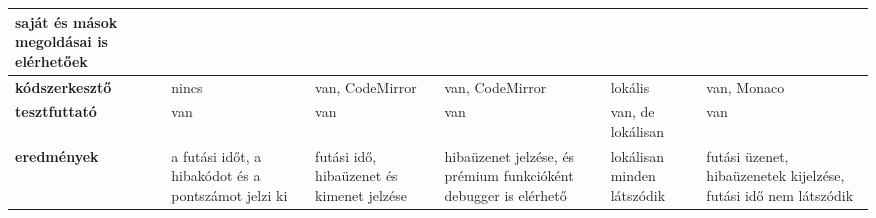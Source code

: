 {\begin{tabularx}{\textwidth}{@{}X|X|X|X|X|X@{}}
        saját és mások megoldásai is elérhetőek                                                                       \\ \hline
        \textbf{kódszerkesztő}                                                                                      &
        nincs                                                                                                       &
        van, CodeMirror                                                                                             &
        van, CodeMirror                                                                                             &
        lokális                                                                                                     &
        van, Monaco                                                                                                   \\ \hline
        \textbf{tesztfuttató}                                                                                       &
        van                                                                                                         &
        van                                                                                                         &
        van                                                                                                         &
        van, de lokálisan                                                                                           &
        van                                                                                                           \\ \hline
        \textbf{eredmények}                                                                                         &
        a futási időt, a hibakódot és a pontszámot jelzi ki                                                         &
        futási idő, hibaüzenet és kimenet jelzése                                                                   &
        hibaüzenet jelzése, és prémium funkcióként debugger is elérhető                                             &
        lokálisan minden látszódik                                                                                  &
        futási üzenet, hibaüzenetek kijelzése, futási idő nem látszódik
    \end{tabularx}
}


